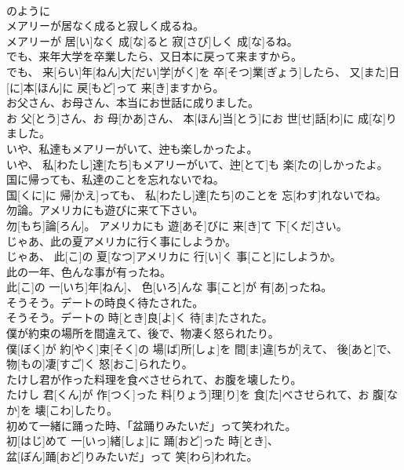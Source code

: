\documentclass[8pt]{extreport}
\begin{document}
\begin{CJK}{UTF8}{min}
\\	のように
\\	メアリーが居なく成ると寂しく成るね。	
\\	メアリーが 居[い]なく 成[な]ると 寂[さび]しく 成[な]るね。
\\	でも、来年大学を卒業したら、又日本に戻って来ますから。	
\\	でも、 来[らい]年[ねん]大[だい]学[がく]を 卒[そつ]業[ぎょう]したら、 又[また]日[に]本[ほん]に 戻[もど]って 来[き]ますから。
\\	お父さん、お母さん、本当にお世話に成りました。	
\\	お 父[とう]さん、お 母[かあ]さん、 本[ほん]当[とう]にお 世[せ]話[わ]に 成[な]りました。
\\	いや、私達もメアリーがいて、迚も楽しかったよ。	
\\	いや、 私[わたし]達[たち]もメアリーがいて、迚[とて]も 楽[たの]しかったよ。
\\	国に帰っても、私達のことを忘れないでね。	
\\	国[くに]に 帰[かえ]っても、 私[わたし]達[たち]のことを 忘[わす]れないでね。
\\	勿論。アメリカにも遊びに来て下さい。	
\\	勿[もち]論[ろん]。 アメリカにも 遊[あそ]びに 来[き]て 下[くだ]さい。
\\	じゃあ、此の夏アメリカに行く事にしようか。	
\\	じゃあ、 此[こ]の 夏[なつ]アメリカに 行[い]く 事[こと]にしようか。
\\	此の一年、色んな事が有ったね。	
\\	此[こ]の 一[いち]年[ねん]、 色[いろ]んな 事[こと]が 有[あ]ったね。
\\	そうそう。デートの時良く待たされた。	
\\	そうそう。デートの 時[とき]良[よ]く 待[ま]たされた。
\\	僕が約束の場所を間違えて、後で、物凄く怒られたり。	
\\	僕[ぼく]が 約[やく]束[そく]の 場[ば]所[しょ]を 間[ま]違[ちが]えて、 後[あと]で、 物[もの]凄[すご]く 怒[おこ]られたり。
\\	たけし君が作った料理を食べさせられて、お腹を壊したり。	
\\	たけし 君[くん]が 作[つく]った 料[りょう]理[り]を 食[た]べさせられて、お 腹[なか]を 壊[こわ]したり。
\\	初めて一緒に踊った時、「盆踊りみたいだ」って笑われた。	
\\	初[はじ]めて 一[いっ]緒[しょ]に 踊[おど]った 時[とき]、
\\	盆[ぼん]踊[おど]りみたいだ」って 笑[わら]われた。

\end{CJK}
\end{document}
